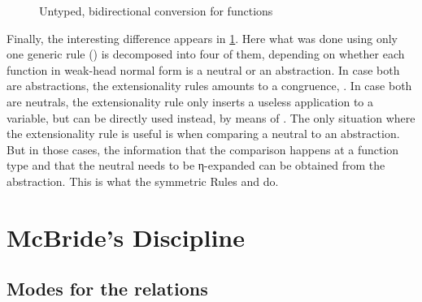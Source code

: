 \begin{figure}[h]
  \ContinuedFloat
  \caption{Untyped, bidirectional conversion for functions}
  \label{fig:bd-uconv-fun}
\end{figure}

Finally, the interesting difference appears in \cref{fig:bd-uconv-fun}. Here what was done
using only one generic rule () is decomposed into four of them,
depending on whether each function in weak-head normal form is a neutral or an abstraction.
In case both are abstractions, the extensionality rules amounts to a congruence, \ie
{}.%
In case both are neutrals, the extensionality rule only inserts
a useless application to a variable, but  can be directly used
instead, by means of .
The only situation where the extensionality rule is useful is when comparing a neutral
to an abstraction. But in those cases, the information that the comparison happens at a function
type and that the neutral needs to be η-expanded can be obtained from the abstraction.
This is what the symmetric Rules  and  do.

\section{McBride’s Discipline}
\label{sec:bd-conv-disc}

\subsection{Modes for the relations}

